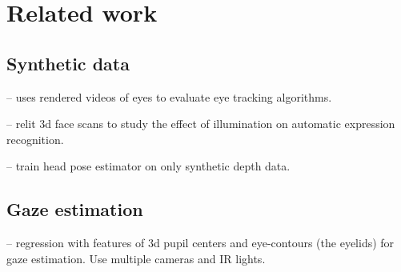 
\section{Related work}

\subsection{Synthetic data}


\cite{swirski2014rendering} -- uses rendered videos of eyes to evaluate eye tracking algorithms.

\cite{stratou2011effect} -- relit 3d face scans to study the effect of illumination on automatic expression recognition.

\cite{fanelli2011real} -- train head pose estimator on only synthetic depth data.

\subsection{Gaze estimation}

\cite{xiong2014gaze} -- regression with features of 3d pupil centers and eye-contours (the eyelids) for gaze estimation.  Use multiple cameras and IR lights.